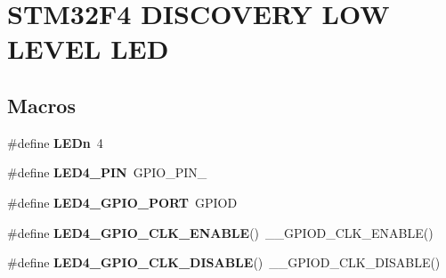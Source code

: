 \hypertarget{group___s_t_m32_f4___d_i_s_c_o_v_e_r_y___l_o_w___l_e_v_e_l___l_e_d}{}\section{S\+T\+M32\+F4 D\+I\+S\+C\+O\+V\+E\+RY L\+OW L\+E\+V\+EL L\+ED}
\label{group___s_t_m32_f4___d_i_s_c_o_v_e_r_y___l_o_w___l_e_v_e_l___l_e_d}
\subsection*{Macros}
\begin{DoxyCompactItemize}
\item 
\mbox{\label{group___s_t_m32_f4___d_i_s_c_o_v_e_r_y___l_o_w___l_e_v_e_l___l_e_d_gab4be2480bf7d44d52aab1190a65a733c}} 
\#define {\bfseries L\+E\+Dn}~4
\item 
\mbox{\label{group___s_t_m32_f4___d_i_s_c_o_v_e_r_y___l_o_w___l_e_v_e_l___l_e_d_gaae684bb3d2f940637ccbc2adeb0e134d}} 
\#define {\bfseries L\+E\+D4\+\_\+\+P\+IN}~G\+P\+I\+O\+\_\+\+P\+I\+N\+\_
\item 
\mbox{\label{group___s_t_m32_f4___d_i_s_c_o_v_e_r_y___l_o_w___l_e_v_e_l___l_e_d_ga6b6f3eb4d23b770de265803afbc2b61b}} 
\#define {\bfseries L\+E\+D4\+\_\+\+G\+P\+I\+O\+\_\+\+P\+O\+RT}~G\+P\+I\+OD
\item 
\mbox{\label{group___s_t_m32_f4___d_i_s_c_o_v_e_r_y___l_o_w___l_e_v_e_l___l_e_d_ga301aa5a187b24af8c121a462d2b08deb}} 
\#define {\bfseries L\+E\+D4\+\_\+\+G\+P\+I\+O\+\_\+\+C\+L\+K\+\_\+\+E\+N\+A\+B\+LE}()~\+\_\+\+\_\+\+G\+P\+I\+O\+D\+\_\+\+C\+L\+K\+\_\+\+E\+N\+A\+B\+LE()
\item 
\mbox{\label{group___s_t_m32_f4___d_i_s_c_o_v_e_r_y___l_o_w___l_e_v_e_l___l_e_d_ga9c737fb47feaa0f730edbe5251750353}} 
\#define {\bfseries L\+E\+D4\+\_\+\+G\+P\+I\+O\+\_\+\+C\+L\+K\+\_\+\+D\+I\+S\+A\+B\+LE}()~\+\_\+\+\_\+\+G\+P\+I\+O\+D\+\_\+\+C\+L\+K\+\_\+\+D\+I\+S\+A\+B\+LE()

\end{DoxyCompactItemize}
